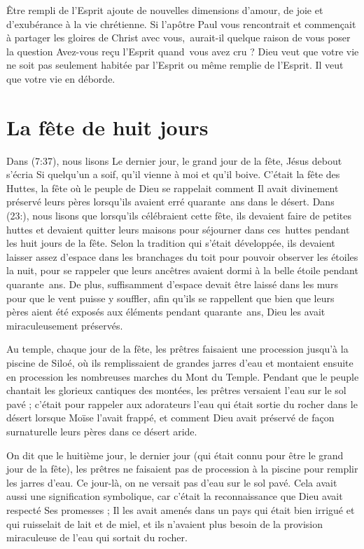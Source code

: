 Être rempli de l'Esprit ajoute de nouvelles dimensions d'amour,
 de joie et d'exubérance à la vie chrétienne.
 Si l'apôtre Paul vous rencontrait et commençait à partager les gloires
 de Christ avec vous,~aurait-il quelque raison de vous poser la question\frcolon{}
 \Og Avez-vous reçu l'Esprit quand~vous avez cru ? \Fg{}
 Dieu veut que votre vie ne soit pas seulement habitée
 par l'Esprit ou même remplie de l'Esprit.
 Il veut que votre vie en déborde.


\section{La f\^ete de huit jours}

Dans (7:37), nous lisons\frcolon{}
 \Og Le dernier jour, le grand jour de la fête, Jésus debout s'écria\frcolon{}
 Si quelqu'un a soif, qu'il vienne à moi et qu'il boive. \Fg{}
 C'était la fête des Huttes, la fête où le peuple de Dieu se rappelait
 comment Il avait divinement préservé leurs pères lorsqu'ils avaient erré
 quarante~ans dans le désert.
 Dans (23:), nous lisons que lorsqu'ils célébraient cette fête,
 ils devaient faire de petites huttes et devaient quitter leurs maisons
 pour séjourner dans ces~huttes pendant les huit jours de la fête.
 Selon la tradition qui s'était développée, ils devaient laisser assez d'espace
 dans les branchages du toit pour pouvoir observer les étoiles la nuit,
 pour se rappeler que leurs ancêtres avaient dormi à la belle étoile
 pendant quarante~ans. De plus, suffisamment d'espace devait être laissé
 dans les murs pour que le vent puisse y souffler, afin qu'ils se rappellent
 que bien que leurs pères aient été exposés aux éléments pendant quarante~ans,
 Dieu les avait miraculeusement préservés.

Au temple, chaque jour de la fête, les prêtres faisaient une procession
 jusqu'à la piscine de Siloé, où ils remplissaient de grandes jarres d'eau
 et montaient ensuite en procession les nombreuses marches du Mont du Temple.
 Pendant que le peuple chantait les glorieux cantiques des montées,
 les prêtres versaient l'eau sur le sol pavé ; c'était pour rappeler
 aux adorateurs l'eau qui était sortie du rocher dans le désert lorsque Moïse
 l'avait frappé, et comment Dieu avait préservé de façon surnaturelle
 leurs pères dans ce désert aride. 

On dit que le huitième jour, le dernier jour (qui était connu pour être
 le grand jour de la fête), les prêtres ne faisaient pas de procession
 à la piscine pour remplir les jarres d'eau.
 Ce jour-là, on ne versait pas d'eau sur le sol pavé.
 Cela avait aussi une signification symbolique, car c'était la reconnaissance
 que Dieu avait respecté Ses promesses ; Il les avait amenés dans un pays
 qui était bien irrigué et qui ruisselait de lait et de miel,
 et ils n'avaient plus besoin de la provision miraculeuse de l'eau
 qui sortait du rocher.

